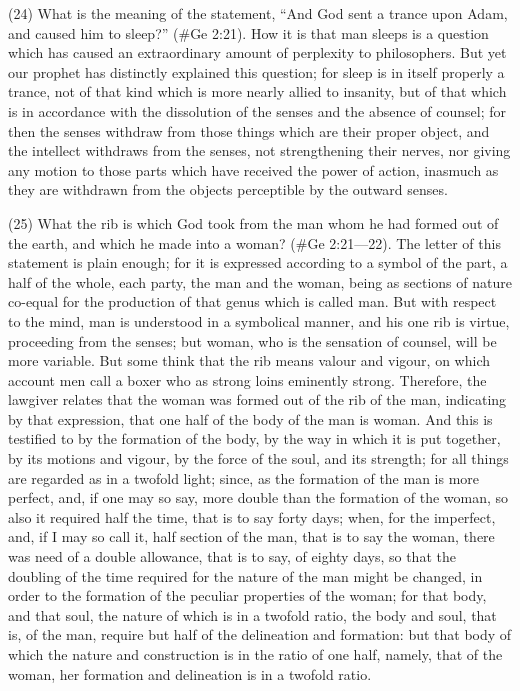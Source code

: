 (24) What is the meaning of the statement, ``And God sent a trance upon Adam, and caused him to
sleep?'' (\#Ge 2:21). How it is that man sleeps is a question which has caused an extraordinary
amount of perplexity to philosophers. But yet our prophet has distinctly explained this question; for
sleep is in itself properly a trance, not of that kind which is more nearly allied to insanity, but of that
which is in accordance with the dissolution of the senses and the absence of counsel; for then the
senses withdraw from those things which are their proper object, and the intellect withdraws from
the senses, not strengthening their nerves, nor giving any motion to those parts which have
received the power of action, inasmuch as they are withdrawn from the objects perceptible by the
outward senses.

(25) What the rib is which God took from the man whom he had formed out of the earth, and which
he made into a woman? (\#Ge 2:21—22). The letter of this statement is plain enough; for it is
expressed according to a symbol of the part, a half of the whole, each party, the man and the
woman, being as sections of nature co-equal for the production of that genus which is called man.
But with respect to the mind, man is understood in a symbolical manner, and his one rib is virtue,
proceeding from the senses; but woman, who is the sensation of counsel, will be more variable.
But some think that the rib means valour and vigour, on which account men call a boxer who as
strong loins eminently strong. Therefore, the lawgiver relates that the woman was formed out of the
rib of the man, indicating by that expression, that one half of the body of the man is woman. And
this is testified to by the formation of the body, by the way in which it is put together, by its motions
and vigour, by the force of the soul, and its strength; for all things are regarded as in a twofold light;
since, as the formation of the man is more perfect, and, if one may so say, more double than the
formation of the woman, so also it required half the time, that is to say forty days; when, for the
imperfect, and, if I may so call it, half section of the man, that is to say the woman, there was need
of a double allowance, that is to say, of eighty days, so that the doubling of the time required for the
nature of the man might be changed, in order to the formation of the peculiar properties of the
woman; for that body, and that soul, the nature of which is in a twofold ratio, the body and soul, that
is, of the man, require but half of the delineation and formation: but that body of which the nature
and construction is in the ratio of one half, namely, that of the woman, her formation and
delineation is in a twofold ratio.

